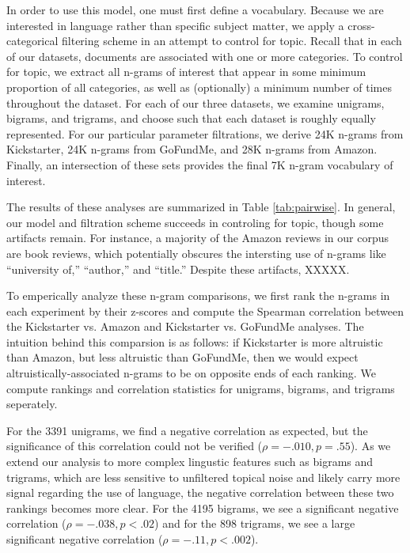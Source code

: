 \documentclass[letterpaper]{article}
\begin{document}
In order to use this model, one must first define a vocabulary. Because we are interested in language rather than specific subject matter, we apply a cross-categorical filtering scheme in an attempt to control for topic. Recall that in each of our datasets, documents are associated with one or more categories. To control for topic, we extract all n-grams of interest that appear in some minimum proportion of all categories, as well as (optionally) a minimum number of times throughout the dataset. For each of our three datasets, we examine unigrams, bigrams, and trigrams, and choose such that each dataset is roughly equally represented. For our particular parameter filtrations, we derive 24K n-grams from Kickstarter, 24K n-grams from GoFundMe, and 28K n-grams from Amazon. Finally, an intersection of these sets provides the final 7K n-gram vocabulary of interest.

The results of these analyses are summarized in Table \ref{tab:pairwise}. In general, our model and filtration scheme succeeds in controling for topic, though some artifacts remain. For instance, a majority of the Amazon reviews in our corpus are book reviews, which potentially obscures the intersting use of n-grams like ``university of,'' ``author,'' and ``title.'' Despite these artifacts, XXXXX.

To emperically analyze these n-gram comparisons, we first rank the n-grams in each experiment by their z-scores and compute the Spearman correlation between the Kickstarter vs. Amazon and Kickstarter vs. GoFundMe analyses. The intuition behind this comparsion is as follows: if Kickstarter is more altruistic than Amazon, but less altruistic than GoFundMe, then we would expect altruistically-associated n-grams to be on opposite ends of each ranking. We compute rankings and correlation statistics for unigrams, bigrams, and trigrams seperately.

For the 3391 unigrams, we find a negative correlation as expected, but the significance of this correlation could not be verified ($\rho = -.010, p = .55$). As we extend our analysis to more complex lingustic features such as bigrams and trigrams, which are less sensitive to unfiltered topical noise and likely carry more signal regarding the use of language, the negative correlation between these two rankings becomes more clear. For the 4195 bigrams, we see a significant negative correlation ($\rho = -.038, p < .02$) and for the 898 trigrams, we see a large significant negative correlation ($\rho = -.11, p < .002$).
\end{document}
